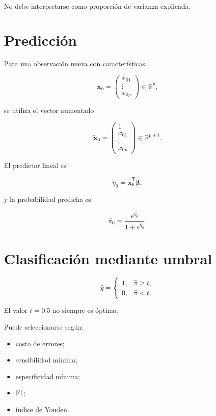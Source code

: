 \documentclass[
  spanish,
  10.5pt,
  letterpaper,
  DIV=11,
  numbers=noendperiod,
  oneside,
  open=any]{scrreprt}
\providecommand{\tightlist}{%
  \setlength{\itemsep}{0pt}\setlength{\parskip}{0pt}}
\theoremstyle{definition}
\theoremstyle{definition}
\theoremstyle{plain}
\theoremstyle{remark}
\begin{document}
No debe interpretarse como proporción de varianza explicada.

\section*{Predicción}\label{predicciuxf3n}


Para una observación nueva con características

\[
\mathbf{x}_0
=
\begin{pmatrix}
x_{01}\\
\vdots\\
x_{0p}
\end{pmatrix}
\in\mathbb{R}^{p},
\]

se utiliza el vector aumentado

\[
\widetilde{\mathbf{x}}_0
=
\begin{pmatrix}
1\\
x_{01}\\
\vdots\\
x_{0p}
\end{pmatrix}
\in\mathbb{R}^{p+1}.
\]

El predictor lineal es

\[
\widehat{\eta}_0
=
\widetilde{\mathbf{x}}_0^{\mathsf T}
\widehat{\boldsymbol{\beta}},
\]

y la probabilidad predicha es

\[
\widehat{\pi}_0
=
\frac{
e^{\widehat{\eta}_0}
}{
1+e^{\widehat{\eta}_0}
}.
\]

\section*{Clasificación mediante
umbral}\label{clasificaciuxf3n-mediante-umbral}


\[
\widehat{y}
=
\begin{cases}
1, & \widehat{\pi}\geq t,\\
0, & \widehat{\pi}<t.
\end{cases}
\]

El valor \(t=0.5\) no siempre es óptimo.

Puede seleccionarse según:

\begin{itemize}
\tightlist
\item
  costo de errores;
\item
  sensibilidad mínima;
\item
  especificidad mínima;
\item
  F1;
\item
  índice de Youden.
\end{itemize}
\end{document}
